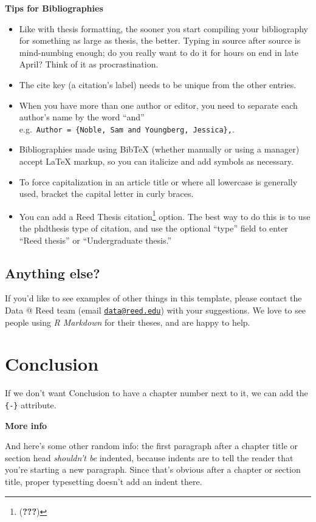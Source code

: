 \documentclass[12pt,twoside]{reedthesis}
\providecommand{\tightlist}{%
  \setlength{\itemsep}{0pt}\setlength{\parskip}{0pt}}
\begin{document}
\textbf{Tips for Bibliographies}
\begin{itemize}
\tightlist
\item
  Like with thesis formatting, the sooner you start compiling your bibliography for something as large as thesis, the better. Typing in source after source is mind-numbing enough; do you really want to do it for hours on end in late April? Think of it as procrastination.
\item
  The cite key (a citation's label) needs to be unique from the other entries.
\item
  When you have more than one author or editor, you need to separate each author's name by the word ``and'' e.g.~\texttt{Author\ =\ \{Noble,\ Sam\ and\ Youngberg,\ Jessica\},}.
\item
  Bibliographies made using BibTeX (whether manually or using a manager) accept LaTeX markup, so you can italicize and add symbols as necessary.
\item
  To force capitalization in an article title or where all lowercase is generally used, bracket the capital letter in curly braces.
\item
  You can add a Reed Thesis citation\footnote{({\textbf{???}})} option. The best way to do this is to use the phdthesis type of citation, and use the optional ``type'' field to enter ``Reed thesis'' or ``Undergraduate thesis.''
\end{itemize}
\hypertarget{anything-else}{%
\section{Anything else?}\label{anything-else}}

If you'd like to see examples of other things in this template, please contact the Data @ Reed team (email \href{mailto:data@reed.edu}{\nolinkurl{data@reed.edu}}) with your suggestions. We love to see people using \emph{R Markdown} for their theses, and are happy to help.

\hypertarget{conclusion}{%
\chapter*{Conclusion}\label{conclusion}}

If we don't want Conclusion to have a chapter number next to it, we can add the \texttt{\{-\}} attribute.

\textbf{More info}

And here's some other random info: the first paragraph after a chapter title or section head \emph{shouldn't be} indented, because indents are to tell the reader that you're starting a new paragraph. Since that's obvious after a chapter or section title, proper typesetting doesn't add an indent there.
\end{document}
